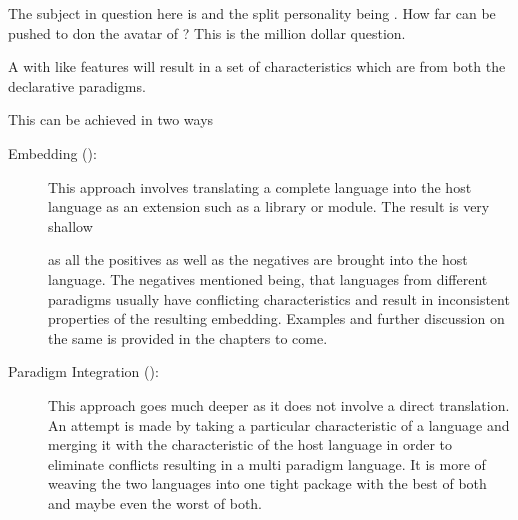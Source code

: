 \documentclass[thesis-solanki.tex]{subfiles}
\begin{document}
The subject in question here is  and the split personality being . How far can  be pushed to
don the avatar of ?
This is the million dollar question.

A  with  like features will result in a set of characteristics which are from
both the declarative paradigms.

This can be achieved in two ways\yyy{,}{:}
\begin{description}
\item [Embedding ():]

  This approach involves translating a complete language into the host language as an extension such as a
  library or module.
  The result is very shallow
  \begin{comment}
    \endnote{%
      Are you defining what ``shallow'' means here?  Or are you arguing that as the result of the embedding being
      shallow that there are certain advantages and drawbacks?
    }
  \end{comment}
  as all the positives as well as the negatives are brought into the host language.
  The negatives mentioned being, that languages from different paradigms usually have conflicting characteristics
  and result in inconsistent properties of the resulting embedding.
  Examples and further discussion on the same is provided in the chapters to come.

\item [Paradigm Integration ():]

  This approach goes much deeper as it does not involve a direct translation.
  An attempt is made by taking a particular characteristic of a language and merging it with the characteristic of
  the host language in order to eliminate conflicts resulting in a multi paradigm language.
  It is more of weaving the two languages into one tight package with the best of both and maybe even the worst of
  both.
\end{description}
\end{document}
